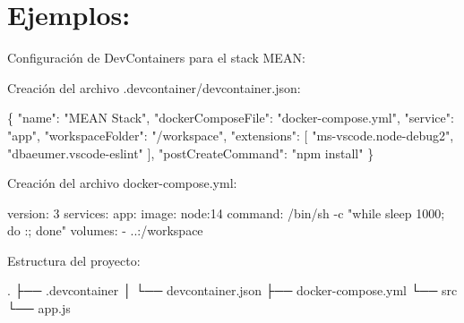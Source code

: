 \documentclass[
  a4paper,
  DIV=11,
  numbers=noendperiod,
  onepage,
  openany]{scrreprt}
\newenvironment{Shaded}{\begin{snugshade}}{\end{snugshade}}
\newcommand{\AttributeTok}[1]{\textcolor[rgb]{0.40,0.45,0.13}{#1}}
\newcommand{\DataTypeTok}[1]{\textcolor[rgb]{0.68,0.00,0.00}{#1}}
\newcommand{\FunctionTok}[1]{\textcolor[rgb]{0.28,0.35,0.67}{#1}}
\newcommand{\KeywordTok}[1]{\textcolor[rgb]{0.00,0.23,0.31}{#1}}
\newcommand{\NormalTok}[1]{\textcolor[rgb]{0.00,0.23,0.31}{#1}}
\newcommand{\OtherTok}[1]{\textcolor[rgb]{0.00,0.23,0.31}{#1}}
\newcommand{\StringTok}[1]{\textcolor[rgb]{0.13,0.47,0.30}{#1}}
\begin{document}
\hypertarget{ejemplos-4}{%
\section{Ejemplos:}\label{ejemplos-4}}

Configuración de DevContainers para el stack MEAN:

Creación del archivo .devcontainer/devcontainer.json:

\begin{Shaded}
\begin{Highlighting}[]
\FunctionTok{\{}
  \DataTypeTok{"name"}\FunctionTok{:} \StringTok{"MEAN Stack"}\FunctionTok{,}
  \DataTypeTok{"dockerComposeFile"}\FunctionTok{:} \StringTok{"docker{-}compose.yml"}\FunctionTok{,}
  \DataTypeTok{"service"}\FunctionTok{:} \StringTok{"app"}\FunctionTok{,}
  \DataTypeTok{"workspaceFolder"}\FunctionTok{:} \StringTok{"/workspace"}\FunctionTok{,}
  \DataTypeTok{"extensions"}\FunctionTok{:} \OtherTok{[}
    \StringTok{"ms{-}vscode.node{-}debug2"}\OtherTok{,}
    \StringTok{"dbaeumer.vscode{-}eslint"}
  \OtherTok{]}\FunctionTok{,}
  \DataTypeTok{"postCreateCommand"}\FunctionTok{:} \StringTok{"npm install"}
\FunctionTok{\}}
\end{Highlighting}
\end{Shaded}

Creación del archivo docker-compose.yml:

\begin{Shaded}
\begin{Highlighting}[]
\FunctionTok{version}\KeywordTok{:}\AttributeTok{ }\StringTok{\textquotesingle{}3\textquotesingle{}}
\FunctionTok{services}\KeywordTok{:}
\AttributeTok{  }\FunctionTok{app}\KeywordTok{:}
\AttributeTok{    }\FunctionTok{image}\KeywordTok{:}\AttributeTok{ node:14}
\AttributeTok{    }\FunctionTok{command}\KeywordTok{:}\AttributeTok{ /bin/sh {-}c "while sleep 1000; do :; done"}
\AttributeTok{    }\FunctionTok{volumes}\KeywordTok{:}
\AttributeTok{      }\KeywordTok{{-}}\AttributeTok{ ..:/workspace}
\end{Highlighting}
\end{Shaded}

Estructura del proyecto:

\begin{Shaded}
\begin{Highlighting}[]
\NormalTok{.}
\NormalTok{├── .devcontainer}
\NormalTok{│   └── devcontainer.json}
\NormalTok{├── docker{-}compose.yml}
\NormalTok{└── src}
\NormalTok{    └── app.js}
\end{Highlighting}
\end{Shaded}
\end{document}

